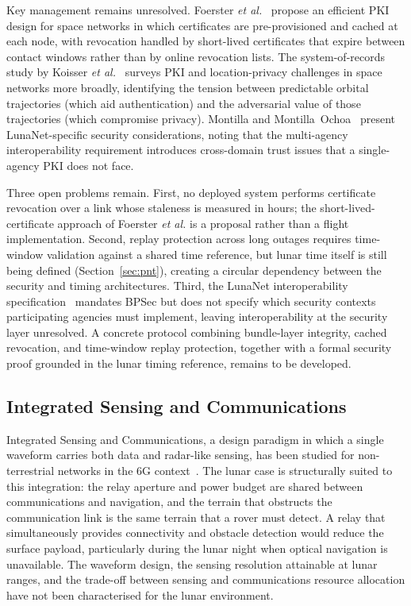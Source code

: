 \documentclass[11pt,a4paper]{article}
\begin{document}
Key management remains unresolved. Foerster \emph{et al.}~\cite{foerster_pki} propose an efficient PKI design for space networks in which certificates are pre-provisioned and cached at each node, with revocation handled by short-lived certificates that expire between contact windows rather than by online revocation lists. The system-of-records study by Koisser \emph{et al.}~\cite{koisser_pki_space} surveys PKI and location-privacy challenges in space networks more broadly, identifying the tension between predictable orbital trajectories (which aid authentication) and the adversarial value of those trajectories (which compromise privacy). Montilla and Montilla~Ochoa~\cite{montilla_dtn_security} present LunaNet-specific security considerations, noting that the multi-agency interoperability requirement introduces cross-domain trust issues that a single-agency PKI does not face.

Three open problems remain. First, no deployed system performs certificate revocation over a link whose staleness is measured in hours; the short-lived-certificate approach of Foerster \emph{et al.} is a proposal rather than a flight implementation. Second, replay protection across long outages requires time-window validation against a shared time reference, but lunar time itself is still being defined (Section~\ref{sec:pnt}), creating a circular dependency between the security and timing architectures. Third, the LunaNet interoperability specification~\cite{lnis_v5} mandates BPSec but does not specify which security contexts participating agencies must implement, leaving interoperability at the security layer unresolved. A concrete protocol combining bundle-layer integrity, cached revocation, and time-window replay protection, together with a formal security proof grounded in the lunar timing reference, remains to be developed.

\subsection{Integrated Sensing and Communications}
Integrated Sensing and Communications, a design paradigm in which a single waveform carries both data and radar-like sensing, has been studied for non-terrestrial networks in the 6G context~\cite{isac_ntn2026}. The lunar case is structurally suited to this integration: the relay aperture and power budget are shared between communications and navigation, and the terrain that obstructs the communication link is the same terrain that a rover must detect. A relay that simultaneously provides connectivity and obstacle detection would reduce the surface payload, particularly during the lunar night when optical navigation is unavailable. The waveform design, the sensing resolution attainable at lunar ranges, and the trade-off between sensing and communications resource allocation have not been characterised for the lunar environment.
\end{document}
